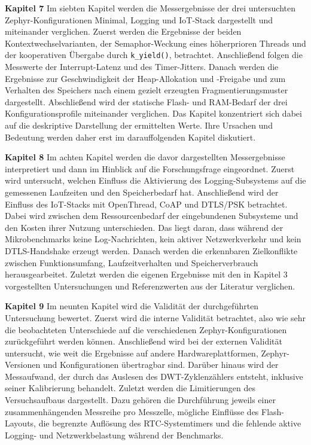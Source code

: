 
\noindent\textbf{Kapitel 7}\quad
Im siebten Kapitel werden die Messergebnisse der drei untersuchten Zephyr-Konfigurationen Minimal, Logging und IoT-Stack dargestellt und miteinander verglichen. Zuerst werden die Ergebnisse der beiden Kontextwechselvarianten, der Semaphor-Weckung eines h{\"o}herprioren Threads und der kooperativen {\"U}bergabe durch \lstinline[style=codeinline]|k_yield()|, betrachtet. Anschlie{\ss}end folgen die Messwerte der Interrupt-Latenz und des Timer-Jitters. Danach werden die Ergebnisse zur Geschwindigkeit der Heap-Allokation und -Freigabe und zum Verhalten des Speichers nach einem gezielt erzeugten Fragmentierungsmuster dargestellt. Abschlie{\ss}end wird der statische Flash- und RAM-Bedarf der drei Konfigurationsprofile miteinander verglichen. Das Kapitel konzentriert sich dabei auf die deskriptive Darstellung der ermittelten Werte. Ihre Ursachen und Bedeutung werden daher erst im darauffolgenden Kapitel diskutiert.

\noindent\textbf{Kapitel 8}\quad
Im achten Kapitel werden die davor dargestellten Messergebnisse interpretiert und dann im Hinblick auf die Forschungsfrage eingeordnet. Zuerst wird untersucht, welchen Einfluss die Aktivierung des Logging-Subsystems auf die gemessenen Laufzeiten und den Speicherbedarf hat. Anschlie{\ss}end wird der Einfluss des IoT-Stacks mit OpenThread, CoAP und DTLS/PSK betrachtet. Dabei wird zwischen dem Ressourcenbedarf der eingebundenen Subsysteme und den Kosten ihrer Nutzung unterschieden. Das liegt daran, dass w{\"a}hrend der Mikrobenchmarks keine Log-Nachrichten, kein aktiver Netzwerkverkehr und kein DTLS-Handshake erzeugt werden. Danach werden die erkennbaren Zielkonflikte zwischen Funktionsumfang, Laufzeitverhalten und Speicherverbrauch herausgearbeitet. Zuletzt werden die eigenen Ergebnisse mit den in Kapitel 3 vorgestellten Untersuchungen und Referenzwerten aus der Literatur verglichen.

\noindent\textbf{Kapitel 9}\quad
Im neunten Kapitel wird die Validit{\"a}t der durchgef{\"u}hrten Untersuchung bewertet. Zuerst wird die interne Validit{\"a}t betrachtet, also wie sehr die beobachteten Unterschiede auf die verschiedenen Zephyr-Konfigurationen zur{\"u}ckgef{\"u}hrt werden k{\"o}nnen. Anschlie{\ss}end wird bei der externen Validit{\"a}t untersucht, wie weit die Ergebnisse auf andere Hardwareplattformen, Zephyr-Versionen und Konfigurationen {\"u}bertragbar sind. Dar{\"u}ber hinaus wird der Messaufwand, der durch das Auslesen des DWT-Zyklenz{\"a}hlers entsteht, inklusive seiner Kalibrierung behandelt. Zuletzt werden die Limitierungen des Versuchsaufbaus dargestellt. Dazu geh{\"o}ren die Durchf{\"u}hrung jeweils einer zusammenh{\"a}ngenden Messreihe pro Messzelle, m{\"o}gliche Einfl{\"u}sse des Flash-Layouts, die begrenzte Aufl{\"o}sung des RTC-Systemtimers und die fehlende aktive Logging- und Netzwerkbelastung w{\"a}hrend der Benchmarks.

